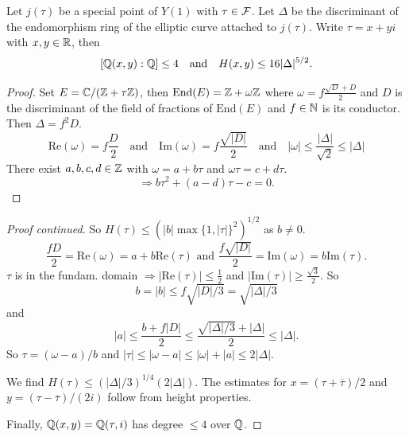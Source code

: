 \documentclass{beamer}
\begin{document}
\begin{frame}
  \begin{lemma}
    Let $j(\tau)$ be a special point of $Y(1)$ with $\tau\in{\mathcal F}$.
    Let $\Delta$ be the discriminant of
    the endomorphism ring of the elliptic curve attached to $j(\tau)$.
    Write $\tau =x+yi$ with
    $x,y\in{\mathbb{R}}$, then
    $$[{\mathbb{Q}}(x,y):{\mathbb{Q}}]\le 4\quad\text{and}\quad H(x,y)\le 16|\Delta|^{5/2}.$$
  \end{lemma}
  \begin{proof}\renewcommand{\qedsymbol}{}
    Set $E = {\mathbb{C}}/({\mathbb{Z}}+\tau{\mathbb{Z}})$, then
    $\mathrm{End}(E) = {\mathbb{Z}} + \omega {\mathbb{Z}}$ where $\omega = f
    \frac{\sqrt{D}+D}{2}$ and $D$ is the discriminant of the field of
    fractions of $\mathrm{End}(E)$ and $f\in{\mathbb{N}}$ is its conductor.
    Then $\Delta = f^2D$.
    \begin{equation*}
      \mathrm{Re}(\omega) = f\frac{D}{2} \quad\text{and}\quad
      \mathrm{Im}(\omega) = f\frac{\sqrt{|D|}}{2}
      \quad\text{and}\quad
      |\omega| \le \frac{|\Delta|}{\sqrt{2}}\le|\Delta|
    \end{equation*}
    There exist $a,b,c,d\in{\mathbb{Z}}$ with
    $\omega=a+b\tau$ and $\omega\tau = c+d\tau$.
    \begin{equation*}
      \Rightarrow b\tau^2+(a-d)\tau-c=0.
    \end{equation*}
  \end{proof}
\end{frame}

\begin{frame}
  \begin{proof}[Proof continued]       
    So $H(\tau) \le (|b| \max\{1,|\tau|\}^2)^{1/2}$ as $b\not=0$.
    $$\frac{fD}{2}=\mathrm{Re}(\omega) =
    a+b\mathrm{Re}(\tau)\text{ and }\frac{f\sqrt{|D|}}{2}=\mathrm{Im}(\omega)
    = b \mathrm{Im}(\tau).$$
     $\tau$ is in the fundam. domain $\Rightarrow
     |\mathrm{Re}(\tau)|\le \frac 12$ and $|\mathrm{Im}(\tau)|\ge
    \frac{\sqrt{3}}{2}$. So
    \begin{equation*}
      b=|b|\le {f \sqrt{|D|/3}} = \sqrt{|\Delta|/3}
    \end{equation*}
    and
    \begin{equation*}
    |a|\le \frac{b+f|D|}{2} \le \frac{\sqrt{|\Delta|/3} +
        |\Delta|}{2} \le |\Delta|. 
    \end{equation*}
    So
    $\tau = (\omega-a)/b$ and $|\tau|\le
    |\omega-a|\le|\omega|+|a| \le 2|\Delta| $.

    We find $H(\tau) \le (|\Delta|/3)^{1/4} (2|\Delta|)$.
    The estimates for $x=(\tau+\overline\tau)/2$ and $y=(\tau-\overline\tau)/(2i)$ follow from  height
    properties.

    Finally, ${\mathbb{Q}}(x,y) ={\mathbb{Q}}(\tau,i)$ has degree $\le 4$
    over ${\mathbb{Q}}$. 
  \end{proof}
\end{frame}
\end{document}
